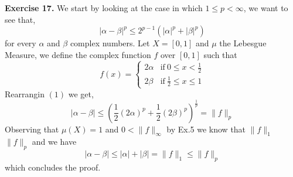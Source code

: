\documentclass{article}
\begin{document}
\pagebreak

\begin{exercise}\textbf{Exercise 17.}
   We start by looking at the case in which $1 \le  p < \infty$, we want to see that,
   \begin{equation}
       | \alpha - \beta |^p \le 2^{p-1} \left( |\alpha|^p + |\beta|^p \right) 
   \end{equation}
   for every $\alpha$ and $\beta$ complex numbers. Let $X = [0,1]$ and $\mu$ the Lebesgue Measure, we define the complex function $f$ over $[0,1]$ such that
   \[
       f \left( x \right) =  
       \begin{cases}
           2\alpha & \text{if}\  0 \le x < \frac{1}{2} \\
           2\beta & \text{if}\  \frac{1}{2} \le x \le 1
       \end{cases}
   \]
   Rearrangin $ \left( 1 \right) $ we get,
   \begin{equation}
       |\alpha - \beta| \le \left( \frac{1}{2} \left( 2\alpha \right)^p + \frac{1}{2} \left( 2\beta \right) ^p \right) ^{\frac{1}{p}} = \|f\|_p 
   \end{equation}
   Observing that $\mu \left( X \right) = 1$ and $0 < \|f\|_\infty $ by Ex.5 we know that $\|f\|_1 $ \le $\|f\|_p $ and we have
   \begin{equation}
       |\alpha - \beta| \le |\alpha| + |\beta| = \|f\|_1 \le \|f\|_p 
   \end{equation}
   which concludes the proof. 


\end{exercise}
\end{document}
